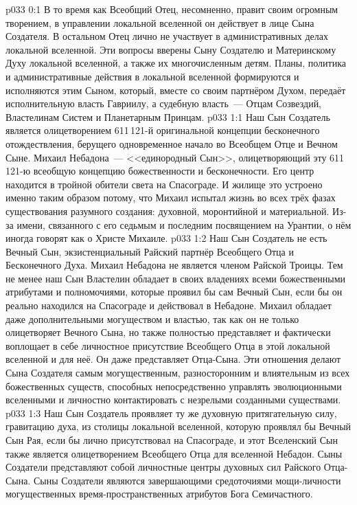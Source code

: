 \author{Глава Архангелов}
\vs p033 0:1 В то время как Всеобщий Отец, несомненно, правит своим огромным творением, в управлении локальной вселенной он действует в лице Сына Создателя. В остальном Отец лично не участвует в административных делах локальной вселенной. Эти вопросы вверены Сыну Создателю и Материнскому Духу локальной вселенной, а также их многочисленным детям. Планы, политика и административные действия в локальной вселенной формируются и исполняются этим Сыном, который, вместе со своим партнёром Духом, передаёт исполнительную власть Гавриилу, а судебную власть~--- Отцам Созвездий, Властелинам Систем и Планетарным Принцам.
\vs p033 1:1 Наш Сын Создатель является олицетворением 611\,121-й оригинальной концепции бесконечного отождествления, берущего одновременное начало во Всеобщем Отце и Вечном Сыне. Михаил Небадона~--- <<единородный Сын>>, олицетворяющий эту 611\,121-ю всеобщую концепцию божественности и бесконечности. Его центр находится в тройной обители света на Спасограде. И жилище это устроено именно таким образом потому, что Михаил испытал жизнь во всех трёх фазах существования разумного создания: духовной, моронтийной и материальной. Из-за имени, связанного с его седьмым и последним посвящением на Урантии, о нём иногда говорят как о Христе Михаиле.
\vs p033 1:2 Наш Сын Создатель не есть Вечный Сын, экзистенциальный Райский партнёр Всеобщего Отца и Бесконечного Духа. Михаил Небадона не является членом Райской Троицы. Тем не менее наш Сын Властелин обладает в своих владениях всеми божественными атрибутами и полномочиями, которые проявил бы сам Вечный Сын, если бы он реально находился на Спасограде и действовал в Небадоне. Михаил обладает даже дополнительными могуществом и властью, так как он не только олицетворяет Вечного Сына, но также полностью представляет и фактически воплощает в себе личностное присутствие Всеобщего Отца в этой локальной вселенной и для неё. Он даже представляет Отца\hyp{}Сына. Эти отношения делают Сына Создателя самым могущественным, разносторонним и влиятельным из всех божественных существ, способных непосредственно управлять эволюционными вселенными и личностно контактировать с незрелыми созданными существами.
\vs p033 1:3 Наш Сын Создатель проявляет ту же духовную притягательную силу, гравитацию духа, из столицы локальной вселенной, которую проявлял бы Вечный Сын Рая, если бы лично присутствовал на Спасограде, и  этот Вселенский Сын также является олицетворением Всеобщего Отца для вселенной Небадон. Сыны Создатели представляют собой личностные центры духовных сил Райского Отца\hyp{}Сына. Сыны Создатели являются завершающими средоточиями мощи\hyp{}личности могущественных время\hyp{}пространственных атрибутов Бога Семичастного.
